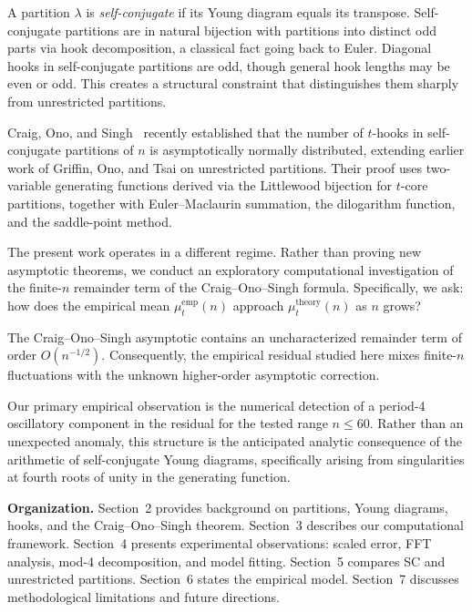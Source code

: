 \documentclass[11pt,reqno]{amsart}
\begin{document}
A partition $\lambda$ is \emph{self-conjugate} if its Young 
diagram equals its transpose. Self-conjugate partitions are 
in natural bijection with partitions into distinct odd parts 
via hook decomposition, a classical fact going back to Euler. 
Diagonal hooks in self-conjugate partitions are odd, though general 
hook lengths may be even or odd. This creates a structural 
constraint that distinguishes them sharply from unrestricted partitions.

Craig, Ono, and Singh~\cite{COS} recently established that 
the number of $t$-hooks in self-conjugate partitions of $n$ 
is asymptotically normally distributed, extending earlier 
work of Griffin, Ono, and Tsai on unrestricted partitions. 
Their proof uses two-variable generating functions derived 
via the Littlewood bijection for $t$-core partitions, 
together with Euler--Maclaurin summation, the dilogarithm 
function, and the saddle-point method.

\medskip

The present work operates in a different regime. Rather than 
proving new asymptotic theorems, we conduct an exploratory computational investigation 
of the finite-$n$ remainder term of the Craig--Ono--Singh formula. 
Specifically, we ask: how does the empirical mean $\mu_t^{\mathrm{emp}}(n)$ approach 
$\mu_t^{\mathrm{theory}}(n)$ as $n$ grows?

The Craig--Ono--Singh asymptotic contains an uncharacterized remainder 
term of order $O(n^{-1/2})$. Consequently, the empirical residual studied 
here mixes finite-$n$ fluctuations with the unknown higher-order 
asymptotic correction. 

Our primary empirical observation is the numerical detection of a period-4 
oscillatory component in the residual for the tested range $n \le 60$. Rather 
than an unexpected anomaly, this structure is the anticipated analytic consequence 
of the arithmetic of self-conjugate Young diagrams, specifically arising from 
singularities at fourth roots of unity in the generating function.

\medskip

\noindent\textbf{Organization.} Section~2 provides background 
on partitions, Young diagrams, hooks, and the Craig--Ono--Singh 
theorem. Section~3 describes our computational framework. 
Section~4 presents experimental observations: scaled error, 
FFT analysis, mod-4 decomposition, and model fitting. 
Section~5 compares SC and unrestricted partitions. 
Section~6 states the empirical model. Section~7 discusses 
methodological limitations and future directions.
\end{document}
